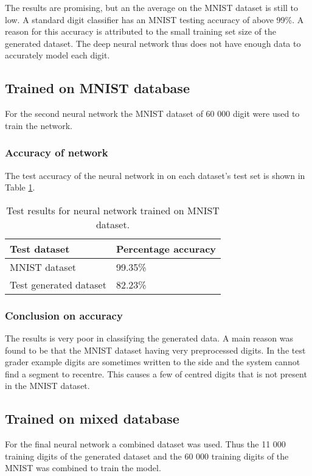 The results are promising, but an the average on the MNIST dataset is still to low. A standard digit classifier has an MNIST testing accuracy of above 99\%. A reason for this accuracy is attributed to the small training set size of the generated dataset. The deep neural network thus does not have enough data to accurately model each digit.

\subsection{Trained on MNIST database}
For the second neural network the MNIST dataset of 60 000 digit were used to train the network.

\subsubsection{Accuracy of network}

The test accuracy of the neural network in on each dataset's test set is shown in Table \ref{tbl:nnResult2}.

\begin{table}
\caption{Test results for neural network trained on MNIST dataset.} \label{tbl:nnResult2}
  \centering
\begin{tabular}{|p{4cm}|p{5cm}|}
\hline
\textbf{Test dataset}&\textbf{Percentage accuracy}\\
\hline
MNIST dataset&99.35\%\\
\hline
Test generated dataset&82.23\%\\
\hline
\end{tabular}
\end{table}

\subsubsection{Conclusion on accuracy}

The results is very poor in classifying the generated data. A main reason was found to be that the MNIST dataset having very preprocessed digits. In the test grader example digits are sometimes written to the side and the system cannot find a segment to recentre. This causes a few of centred digits that is not present in the MNIST dataset.

\subsection{Trained on mixed database}
For the final neural network a combined dataset was used. Thus the 11 000 training digits of the generated dataset and the 60 000 training digits of the MNIST was combined to train the model.

